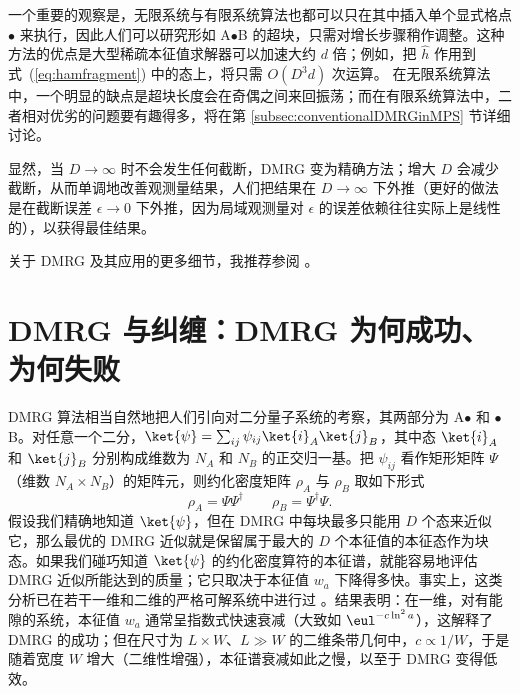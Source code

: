 一个重要的观察是，无限系统与有限系统算法也都可以只在其中插入单个显式格点 $\bullet$ 来执行，因此人们可以研究形如 A$\bullet$B 的超块，只需对增长步骤稍作调整。这种方法的优点是大型稀疏本征值求解器可以加速大约 $d$ 倍；例如，把 $\hat{h}$ 作用到式~(\ref{eq:hamfragment}) 中的态上，将只需 $O(D^3 d)$ 次运算。
在无限系统算法中，一个明显的缺点是超块长度会在奇偶之间来回振荡；而在有限系统算法中，二者相对优劣的问题要有趣得多，将在第 \ref{subsec:conventionalDMRGinMPS} 节详细讨论。

显然，当 $D\rightarrow\infty$ 时不会发生任何截断，DMRG 变为精确方法；增大 $D$ 会减少截断，从而单调地改善观测量结果，人们把结果在 $D\rightarrow\infty$ 下外推（更好的做法是在截断误差 $\epsilon\rightarrow 0$ 下外推，因为局域观测量对 $\epsilon$ 的误差依赖往往实际上是线性的），以获得最佳结果。

关于 DMRG 及其应用的更多细节，我推荐参阅 \cite{Schollwoeck05}。
  
\section{DMRG 与纠缠：DMRG 为何成功、为何失败}
DMRG 算法相当自然地把人们引向对二分量子系统的考察，其两部分为 A$\bullet$ 和 $\bullet$B。对任意一个二分，$\ket{\psi} = \sum_{ij} \psi_{ij} \ket{i}_A \ket{j}_B$，其中态 $\ket{i}_A$ 和 $\ket{j}_B$ 分别构成维数为 $N_A$ 和 $N_B$ 的正交归一基。把 $\psi_{ij}$ 看作矩形矩阵 $\Psi$（维数 $N_A \times N_B$）的矩阵元，则约化密度矩阵 $\rho_A$ 与 $\rho_B$ 取如下形式
\begin{equation}
\rho_A = \Psi \Psi^\dagger \quad\quad \rho_B = \Psi^\dagger \Psi.
\label{eq:ABdensityoperators}
\end{equation}
假设我们精确地知道 $\ket{\psi}$，但在 DMRG 中每块最多只能用 $D$ 个态来近似它，那么最优的 DMRG 近似就是保留属于最大的 $D$ 个本征值的本征态作为块态。如果我们碰巧知道 $\ket{\psi}$ 的约化密度算符的本征谱，就能容易地评估 DMRG 近似所能达到的质量；它只取决于本征值 $w_a$ 下降得多快。事实上，这类分析已在若干一维和二维的严格可解系统中进行过 \cite{Peschel99,Okunishi99,Chung00,Chung01,Chan02}。结果表明：在一维，对有能隙的系统，本征值 $w_a$ 通常呈指数式快速衰减（大致如 $\eul^{- c \ln^2 a}$），这解释了 DMRG 的成功；但在尺寸为 $L \times W$、$L\gg W$ 的二维条带几何中，$c \propto 1/W$，于是随着宽度 $W$ 增大（二维性增强），本征谱衰减如此之慢，以至于 DMRG 变得低效。

